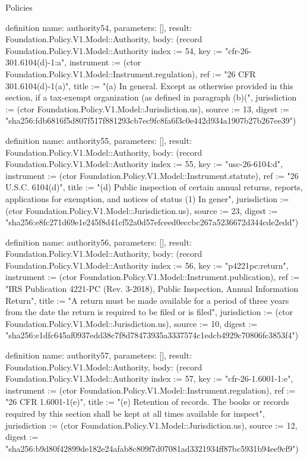 \begin{lexlean}{Policies}
\begin{semanticmodule}
definition{
  name: authority54,
  parameters: [],
  result: Foundation.Policy.V1.Model::Authority,
  body: (record Foundation.Policy.V1.Model::Authority {index := 54, key := "cfr-26-301.6104(d)-1:a", instrument := (ctor Foundation.Policy.V1.Model::Instrument.regulation), ref := "26 CFR 301.6104(d)-1(a)", title := "(a) In general. Except as otherwise provided in this section, if a tax-exempt organization (as defined in paragraph (b)(", jurisdiction := (ctor Foundation.Policy.V1.Model::Jurisdiction.us), source := 13, digest := "sha256:fdb6816f5d807f517f881293cb7ec9fc8fa6f3c0e442d934a1907b27b267ee39"})
}

definition{
  name: authority55,
  parameters: [],
  result: Foundation.Policy.V1.Model::Authority,
  body: (record Foundation.Policy.V1.Model::Authority {index := 55, key := "usc-26-6104:d", instrument := (ctor Foundation.Policy.V1.Model::Instrument.statute), ref := "26 U.S.C. 6104(d)", title := "(d) Public inspection of certain annual returns, reports, applications for exemption, and notices of status (1) In gener", jurisdiction := (ctor Foundation.Policy.V1.Model::Jurisdiction.us), source := 23, digest := "sha256:e8fc271d69e1e245f8d41cf52a0d57efceed0eccbc267a5236672d344cde2edd"})
}

definition{
  name: authority56,
  parameters: [],
  result: Foundation.Policy.V1.Model::Authority,
  body: (record Foundation.Policy.V1.Model::Authority {index := 56, key := "p4221pc:return", instrument := (ctor Foundation.Policy.V1.Model::Instrument.publication), ref := "IRS Publication 4221-PC (Rev. 3-2018), Public Inspection, Annual Information Return", title := "A return must be made available for a period of three years from the date the return is required to be filed or is filed", jurisdiction := (ctor Foundation.Policy.V1.Model::Jurisdiction.us), source := 10, digest := "sha256:e1dfc645af0937edd38c7f8d78473935a3337574c1edcb4929c70806fc3853f4"})
}

definition{
  name: authority57,
  parameters: [],
  result: Foundation.Policy.V1.Model::Authority,
  body: (record Foundation.Policy.V1.Model::Authority {index := 57, key := "cfr-26-1.6001-1:e", instrument := (ctor Foundation.Policy.V1.Model::Instrument.regulation), ref := "26 CFR 1.6001-1(e)", title := "(e) Retention of records. The books or records required by this section shall be kept at all times available for inspect", jurisdiction := (ctor Foundation.Policy.V1.Model::Jurisdiction.us), source := 12, digest := "sha256:b9d80f42899de182e24afab8c809f7d07081ad3321934ff87bc5931b94ee9cf9"})
}


\end{semanticmodule}
\end{lexlean}
